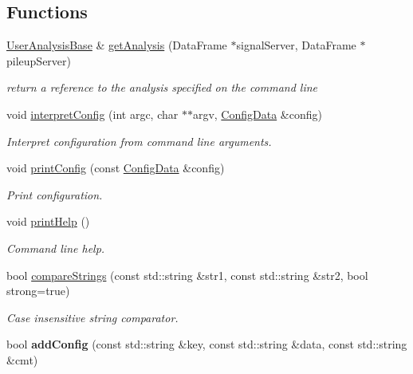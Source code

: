 \subsection*{Functions}
\begin{CompactItemize}
\item 
\hypertarget{namespaceConfiguration_34903f1cb53117431c95c68e85ae19d3}{
\hyperlink{classUserAnalysisBase}{User\-Analysis\-Base} \& \hyperlink{namespaceConfiguration_34903f1cb53117431c95c68e85ae19d3}{get\-Analysis} (Data\-Frame $\ast$signal\-Server, Data\-Frame $\ast$pileup\-Server)}
\label{namespaceConfiguration_34903f1cb53117431c95c68e85ae19d3}

\begin{CompactList}\small\item\em return a reference to the analysis specified on the command line \item\end{CompactList}\item 
void \hyperlink{namespaceConfiguration_abb30e1934601532c3fee5dc06c9e2f8}{interpret\-Config} (int argc, char $\ast$$\ast$argv, \hyperlink{classConfiguration_1_1ConfigData}{Config\-Data} \&config)
\begin{CompactList}\small\item\em Interpret configuration from command line arguments. \item\end{CompactList}\item 
void \hyperlink{namespaceConfiguration_c58339bca4863c15eee2d3bfc7f2a563}{print\-Config} (const \hyperlink{classConfiguration_1_1ConfigData}{Config\-Data} \&config)
\begin{CompactList}\small\item\em Print configuration. \item\end{CompactList}\item 
\hypertarget{namespaceConfiguration_6f1c4d1fd0cc68691740aa1e58293997}{
void \hyperlink{namespaceConfiguration_6f1c4d1fd0cc68691740aa1e58293997}{print\-Help} ()}
\label{namespaceConfiguration_6f1c4d1fd0cc68691740aa1e58293997}

\begin{CompactList}\small\item\em Command line help. \item\end{CompactList}\item 
bool \hyperlink{namespaceConfiguration_0106b3f61292a595d6c4cc92c8c4812e}{compare\-Strings} (const std::string \&str1, const std::string \&str2, bool strong=true)
\begin{CompactList}\small\item\em Case insensitive string comparator. \item\end{CompactList}\item 
\hypertarget{namespaceConfiguration_f95098a185dfb00ed8c6728b127e11e9}{
bool \textbf{add\-Config} (const std::string \&key, const std::string \&data, const std::string \&cmt)}
\label{namespaceConfiguration_f95098a185dfb00ed8c6728b127e11e9}


\end{CompactItemize}
